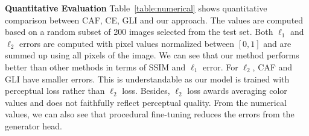 \noindent\textbf{Quantitative Evaluation} Table~\ref{table:numerical} shows quantitative comparison between CAF, CE, GLI and our approach. The values are computed based on a random subset of 200 images selected from the test set. Both $\ell_1$ and $\ell_2$ errors are computed with pixel values normalized between $[0,1]$ and are summed up using all pixels of the image. We can see that our method performs better than other methods in terms of SSIM and $\ell_1$ error. For $\ell_2$, CAF and GLI have smaller errors. This is understandable as our model is trained with perceptual loss rather than $\ell_2$ loss. Besides, $\ell_2$ loss awards averaging color values and does not faithfully reflect perceptual quality. From the numerical values, we can also see that procedural fine-tuning reduces the errors from the generator head. 

\begin{table}[!ht]
\begin{center}
  \end{center}
  \caption{Numerical comparison between CAF, CE and GLI, our generator head results and our final results. Up/down are results of center/random region completion. Note that for SSIM, larger values mean greater similarity in terms of content structure and indicate better performance.}
  \label{table:numerical}
\end{table}


